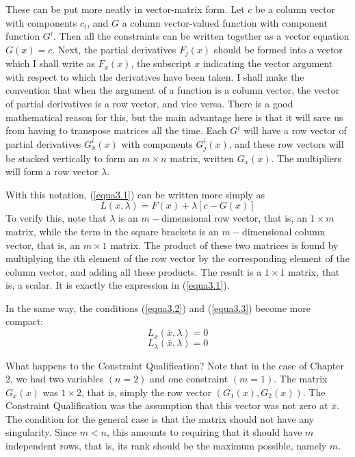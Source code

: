 These can be put more neatly in vector-matrix form. Let $c$ be a column vector with components $c_i$, and $G$ a column vector-valued function with component function $G^i$. Then all the constraints can be written together as a vector equation $G(x)=c$. Next, the partial derivatives $F_j(x)$ should be formed into a vector which I shall write as $F_x(x)$, the subscript $x$ indicating the vector argument with respect to which the derivatives have been taken. I shall make the convention that when the argument of a function is a column vector, the vector of partial derivatives is a row vector, and vice versa. There is a good mathematical reason for this, but the main advantage here is that it will save us from having to transpose matrices all the time. Each $G^i$ will have a row vector of partial derivatives $G_x^i(x)$ with components $G_j^i(x)$, and these row vectors will be stacked vertically to form an $m \times n$ matrix, written $G_x(x)$. The multipliers will form a row vector $\lambda$.

With this notation, (\ref{equa3.1}) can be written more simply as
\begin{equation} \label{equa3.4}
L(x,\lambda) = F(x) + \lambda[c-G(x)]
\end{equation}
To verify this, note that $\lambda$ is an $m-$dimensional row vector, that is,
an $1 \times m$ matrix, while the term in the square brackets is an $m-$dimensional column vector, that is, an $m \times 1$ matrix. The product of these two matrices is found by multiplying the $i$th element of the row vector by the corresponding element of the column vector, and adding all these products. The result is a $1 \times 1$ matrix, that is, a scalar. It is exactly the expression in (\ref{equa3.1}).

In the same way, the conditions (\ref{equa3.2}) and (\ref{equa3.3}) become more compact:
\begin{equation} \label{equa3.5}
L_x(\bar{x}, \lambda) = 0
\end{equation}
\begin{equation} \label{equa3.6}
L_\lambda(\bar{x}, \lambda) = 0
\end{equation}

What happens to the Constraint Qualification? Note that in the case of Chapter 2, we had two variables $(n=2)$ and one constraint $(m=1)$. The matrix $G_x(x)$ was $1 \times 2$, that is, simply the row vector $( G_1(x), G_2(x)  )$. The Constraint Qualification was the assumption that this vector was not zero at $\bar{x}$. The condition for the general case is that the matrix should not have any singularity. Since $m<n$, this amounts to requiring that it should have $m$ independent rows, that is, its rank should be the maximum possible, namely $m$.


